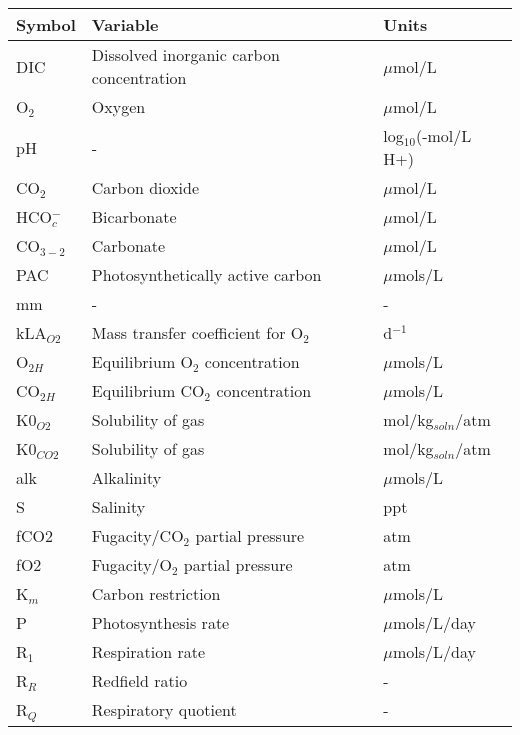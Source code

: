 \documentclass{ruthesis}
\begin{document}
\begin{tabular}{l l  | l}
	 \hline
	Symbol & Variable & Units  \\ \hline
	DIC &  Dissolved inorganic carbon concentration & $\mu$mol/L  \\
	O$_2$ & Oxygen  &  $\mu$mol/L \\
	pH & -  & log$_{10}$(-mol/L H+)  \\
	CO$_2$ & Carbon dioxide  & $\mu$mol/L \\
	HCO$_c^-$ & Bicarbonate & $\mu$mol/L  \\
	CO$_{3-2}$ & Carbonate  & $\mu$mol/L \\
	PAC & Photosynthetically active carbon & $\mu$mols/L  \\
	mm & - & - \\
	kLA$_{O2}$  & Mass transfer coefficient for O$_2$ &  d$^{-1}$  \\
	O$_{2H}$  & Equilibrium O$_2$ concentration  & $\mu$mols/L  \\
	CO$_{2H}$  & Equilibrium CO$_2$ concentration  & $\mu$mols/L  \\
	K0$_{O2}$ &  Solubility of gas & mol/kg$_{soln}$/atm  \\
	K0$_{CO2}$ & Solubility of gas & mol/kg$_{soln}$/atm   \\
	alk  & Alkalinity & $\mu$mols/L  \\
	S  & Salinity &  ppt  \\
	fCO2  & Fugacity/CO$_2$ partial pressure &  atm  \\
	fO2  & Fugacity/O$_2$ partial pressure &  atm \\
	
	K$_m$ & Carbon restriction & $\mu$mols/L \\
	
	P & Photosynthesis rate & $\mu$mols/L/day \\
	R$_1$ & Respiration rate & $\mu$mols/L/day \\
	R$_R$ & Redfield ratio & - \\	
	R$_Q$ & Respiratory quotient & - \\
\end{tabular}
\end{document}
